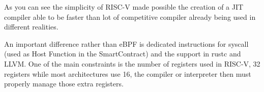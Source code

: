 \documentclass[../main.tex]{subfiles}
\begin{document}
As you can see the simplicity of RISC-V made possible the creation of a JIT compiler able to be faster than lot of competitive compiler already being used in different realities.

An important difference rather than eBPF is dedicated instructions for syscall (used as Host Function in the SmartContract) and the support in rustc and LLVM. One of the main constraints is the number of registers used in RISC-V, 32 registers while most architectures use 16, the compiler or interpreter then must properly manage those extra registers.
\end{document}
